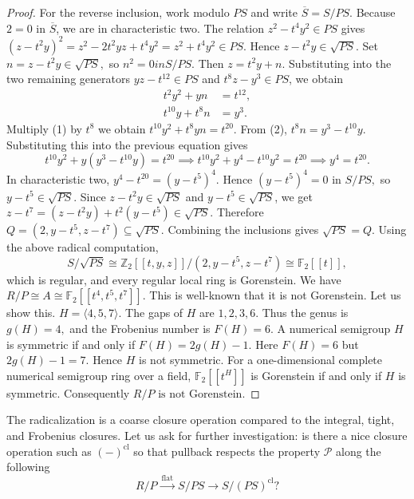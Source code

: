 \documentclass[10pt,a4paper]{amsart}
\theoremstyle{definition}
\theoremstyle{remark}
\begin{document}
\begin{proof}
For the reverse inclusion, work modulo \(PS\) and write
\(
\overline{S}=S/PS.
\)
Because \(2=0\) in \(\overline S\), we are in characteristic two.
The relation
\(
z^2-t^4y^2\in PS
\)
gives
\(
(z-t^2y)^2
=
z^2-2t^2yz+t^4y^2
=
z^2+t^4y^2
\in PS.
\)
Hence
\(
z-t^2y\in\sqrt{PS}.
\)
Set
$
n=z-t^2y\in\sqrt{PS},$
so 
$n^2=0 { in } S/PS.$
Then \(z=t^2y+n\). Substituting into the two remaining generators
\(yz-t^{12}\in PS\) and \(t^8z-y^3\in PS\), we obtain
\begin{align}
t^2y^2+yn &= t^{12}, \tag{1}\\
t^{10}y+t^8n &= y^3. \tag{2}
\end{align}
Multiply (1) by \(t^8\) we obtain
\(
t^{10}y^2+t^8yn=t^{20}.
\)
From (2),
\(
t^8n=y^3-t^{10}y.
\)
Substituting this into the previous equation gives
\[
t^{10}y^2+y(y^3-t^{10}y)=t^{20}
\implies
t^{10}y^2+y^4-t^{10}y^2=t^{20}
\implies
y^4=t^{20}.
\]
In characteristic two,
\(
y^4-t^{20}=(y-t^5)^4.
\)
Hence
\(
(y-t^5)^4=0
 \text{ in }S/PS,
\)
so
\(
y-t^5\in\sqrt{PS}.
\)
Since \(z-t^2y\in\sqrt{PS}\) and \(y-t^5\in\sqrt{PS}\), we get
\(
z-t^7
=
(z-t^2y)+t^2(y-t^5)
\in\sqrt{PS}.
\)
Therefore
\(
Q=(2,y-t^5,z-t^7)\subseteq\sqrt{PS}.
\)
Combining the inclusions gives
\({\sqrt{PS}=Q.}
\)
Using the above radical computation,
\[
S/\sqrt{PS}
\cong
\mathbb Z_2[[t,y,z]]/(2,y-t^5,z-t^7)
\cong
\mathbb F_2[[t]],
\]
which is regular, and every regular local ring is Gorenstein.
 We have
 \(
 R/P\cong A\cong\mathbb F_2[[t^4,t^5,t^7]].
 \)
 This is well-known that it is not Gorenstein.
 Let us show this.
 \(
 H=\langle4,5,7\rangle.
 \)
 The gaps of $H$ are
 \(
 1,2,3,6.
 \)
 Thus the genus is
 \(
 g(H)=4,
 \)
 and the Frobenius number is
 \(
 F(H)=6.
 \)
 A numerical semigroup $H$ is symmetric if and only if
 \(
 F(H)=2g(H)-1.
 \)
 Here
 \(
 F(H)=6 \)
 {but}
 \( 2g(H)-1=7.
 \)
 Hence $H$ is not symmetric.
 For a one-dimensional complete numerical semigroup ring over a field,
 \(
 \mathbb F_2[[t^H]]
 \)
 is Gorenstein if and only if $H$ is symmetric. 
 Consequently
 \(
 {R/P\text{ is not Gorenstein}.}
 \)
 \end{proof}

The radicalization is a coarse closure operation compared to the integral, tight, and Frobenius closures. Let us ask for further investigation: is there a nice closure operation such as \((-)^{\mathrm{cl}}\) so that pullback respects the property \(\mathcal{P}\) along the following
\[
R/P \xrightarrow{\ \mathrm{flat}\ } S/PS \longrightarrow S/(PS)^{\mathrm{cl}}?
\]
\end{document}
